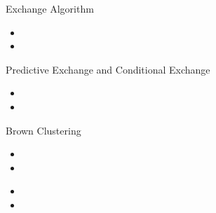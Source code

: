 \documentclass[xcolor=pdftex,x11names,table,hyperref]{beamer}
\begin{document}
\begin{frame}{}
	\hspace*{-19.0em}%
	\scalebox{0.77}{%
		
	}%
\end{frame}


\begin{frame}{Exchange Algorithm}
\begin{itemize}
	\item 
	\item 
\end{itemize}
\end{frame}

\begin{frame}{Predictive Exchange and Conditional Exchange}
\begin{itemize}
	\item 
	\item 
\end{itemize}
\end{frame}


\begin{frame}{Brown Clustering}
\begin{itemize}
	\item 
	\item 
\end{itemize}
\end{frame}


\begin{frame}{}
\begin{itemize}
	\item 
	\item 
\end{itemize}
\end{frame}





\end{document}

